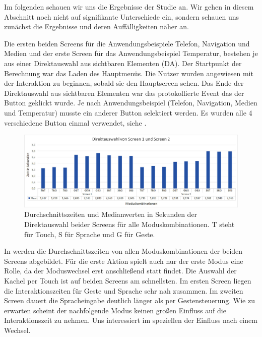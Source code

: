Im folgenden schauen wir uns die Ergebnisse der Studie an. 
Wir gehen in diesem Abschnitt noch nicht auf signifikante Unterschiede ein, sondern schauen uns zunächst die Ergebnisse und deren Auffälligkeiten näher an. 

Die ersten beiden Screens für die Anwendungsbeispiele Telefon, Navigation und Medien und der erste Screen für das Anwendungsbeispiel Temperatur, bestehen je aus einer Direktauswahl aus sichtbaren Elementen (DA). 
Der Startpunkt der Berechnung war das Laden des Hauptmenüs. 
Die Nutzer wurden angewiesen mit der Interaktion zu beginnen, sobald sie den Hauptscreen sehen. 
Das Ende der Direktauswahl aus sichtbaren Elementen war das protokollierte Event das der Button geklickt wurde. 
Je nach Anwendungsbeispiel (Telefon, Navigation, Medien und Temperatur) musste ein anderer Button selektiert werden. 
Es wurden alle 4 verschiedene Button einmal verwendet, siehe .

\begin{figure}[ht]
  \centering
  \includegraphics[width=1\textwidth]{img/DA_Screen12.JPG}
  \caption[Durchschnittszeiten in Sekunden der Direktauswahl]{Durchschnittszeiten und Medianwerten in Sekunden der Direktauswahl beider Screens für alle Moduskombinationen. T steht für Touch, S für Sprache und G für Geste.}
  \label{fig:DA_Screen12}
\end{figure}

In  werden die Durchschnittszeiten von allen Moduskombinationen der beiden Screens abgebildet. 
Für die erste Aktion spielt auch nur der erste Modus eine Rolle, da der Moduswechsel erst anschließend statt findet. 
Die Auswahl der Kachel per Touch ist auf beiden Screens am schnellsten. 
Im ersten Screen liegen die Interaktionszeiten für Geste und Sprache sehr nah zusammen. 
Im zweiten Screen dauert die Spracheingabe deutlich länger als per Gestensteuerung.
Wie zu erwarten scheint der nachfolgende Modus keinen großen Einfluss auf die Interaktionszeit zu nehmen. 
Uns interessiert im speziellen der Einfluss nach einem Wechsel. 

